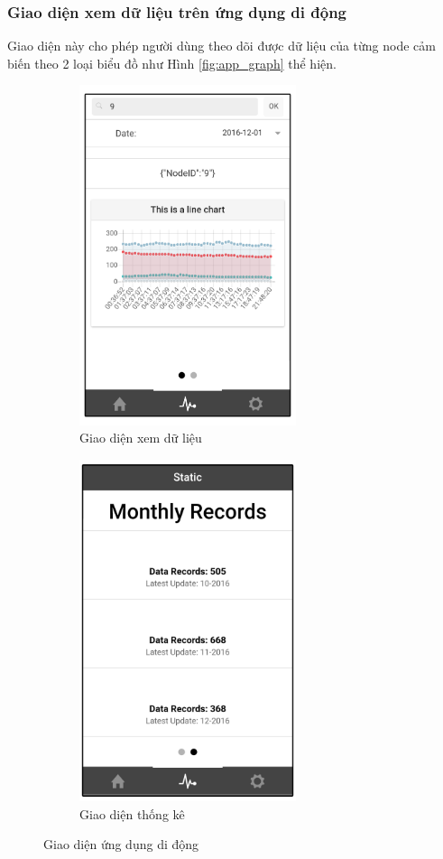 \subsubsection*{Giao diện xem dữ liệu trên ứng dụng di động}
Giao diện này cho phép người dùng theo dõi được dữ liệu của từng node cảm biến theo 2 loại biểu đồ như Hình \ref{fig:app_graph} thể hiện.
\begin{figure}[H]
\centering  
  \begin{subfigure}[b]{0.5\textwidth}
    \includegraphics[width=2.5in]{main_4}
    \caption[Giao diện xem dữ liệu]{Giao diện xem dữ liệu}
    \label{fig:main_4}
  \end{subfigure}\hfill
  \begin{subfigure}[b]{0.5\textwidth}
    \includegraphics[width=2.5in]{main_3}
  	 \caption[Giao diện thống kê]{Giao diện thống kê}
    \label{fig:main_3}
  \end{subfigure}
  \caption{Giao diện ứng dụng di động}\label{fig:giaodienchinh2}
\end{figure}

